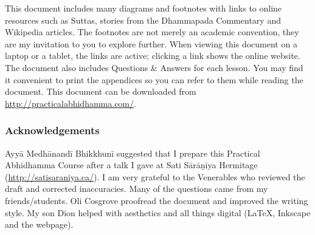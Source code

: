 This document includes many diagrams and footnotes with links to online resources such as Suttas, stories from the Dhammapada Commentary and Wikipedia articles. The footnotes are not merely an academic convention, they are my invitation to you to explore further. When viewing this document on a laptop or a tablet, the links are active; clicking a link shows the online website. The document also includes Questions \& Answers for each lesson. You may find it convenient to print the appendices so you can refer to them while reading the document. This document can be downloaded from \url{http://practicalabhidhamma.com/}.

\subsubsection*{Acknowledgements}

Ayyā Medhānandī Bhikkhunī suggested that I prepare this Practical Abhidhamma Course after a talk I gave at Sati Sārāṇīya Hermitage (\url{http://satisaraniya.ca/}). I am very grateful to the Venerables who reviewed the draft and corrected inaccuracies. Many of the questions came from my friends/students. Oli Cosgrove proofread the document and improved the writing style. My son Dion helped with aesthetics and all things digital (\LaTeX, Inkscape and the webpage).
